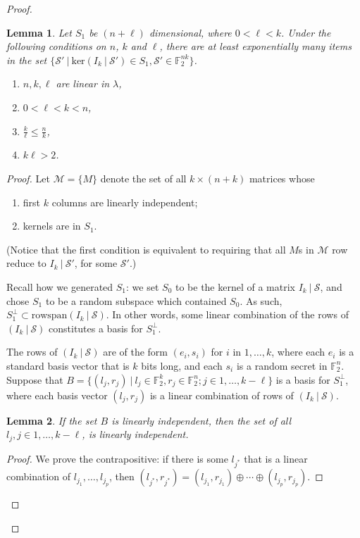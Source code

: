 \documentclass{article}
\newtheorem{lemma}{Lemma}[section]
\begin{document}
\begin{proof}
\begin{itemize}
\begin{lemma}
\label{lemma:expmany}
Let $S_1$ be $(n+\ell)$ dimensional, where $0 < \ell < k$. Under the following conditions on $n$, $k$ and $\ell$, there are at least exponentially many items in the set $\big\{ \mathcal{S}' \:\big|\: \mathrm{ker}(I_k \:|\: \mathcal{S}') \in S_1, \mathcal{S}' \in \mathbb{F}_2^{nk} \big\}$.
\begin{enumerate}
	\item $n, k, \ell$ are linear in $\lambda$,
	\item $0 < \ell < k < n$,
	\item $\frac{k}{\ell} \leq \frac{n}{k}$,
	\item $k \ell > 2$.
\end{enumerate}
\end{lemma}
\begin{proof}
Let $\mathcal{M} = \{ M \}$ denote the set of all $k \times (n+k)$ matrices whose
\begin{enumerate}
	\item first $k$ columns are linearly independent;
	\item kernels are in $S_1$.
\end{enumerate}
(Notice that the first condition is equivalent to requiring that all $M$s in $\mathcal{M}$ row reduce to $I_k \:|\: \mathcal{S}'$, for some $\mathcal{S}'$.)

Recall how we generated $S_1$: we set $S_0$ to be the kernel of a matrix $I_k \:|\: \mathcal{S}$, and chose $S_1$ to be a random subspace which contained $S_0$. As such, $S_1^\perp \subset \mathrm{rowspan}(I_k \:|\: \mathcal{S})$. In other words, some linear combination of the rows of $(I_k \:|\: \mathcal{S})$ constitutes a basis for $S_1^\perp$.

The rows of $(I_k \:|\: \mathcal{S})$ are of the form $(e_i, s_i)$ for $i$ in $1, \ldots, k$, where each $e_i$ is a standard basis vector that is $k$ bits long, and each $s_i$ is a random secret in $\mathbb{F}_2^n$. Suppose that $B = \big\{ (l_j, r_j) \:\big|\: l_j \in \mathbb{F}_2^k, r_j \in \mathbb{F}_2^n; j \in 1, \ldots, k - \ell \big\}$ is a basis for $S_1^\perp$, where each basis vector $(l_j, r_j)$ is a linear combination of rows of $(I_k \:|\: \mathcal{S})$.

\begin{lemma}
\label{lemma:linind}
If the set $B$ is linearly independent, then the set of all $l_j, j \in 1, \ldots, k - \ell$, is linearly independent.
\end{lemma}
\begin{proof}
We prove the contrapositive: if there is some $l_{j^*}$ that is a linear combination of $l_{j_1}, \ldots, l_{j_p}$, then $(l_{j^*}, r_{j^*}) = (l_{j_1}, r_{j_1}) \oplus \cdots \oplus (l_{j_p}, r_{j_p})$.


\end{proof}
\end{proof}
\end{itemize}
\end{proof}
\end{document}
